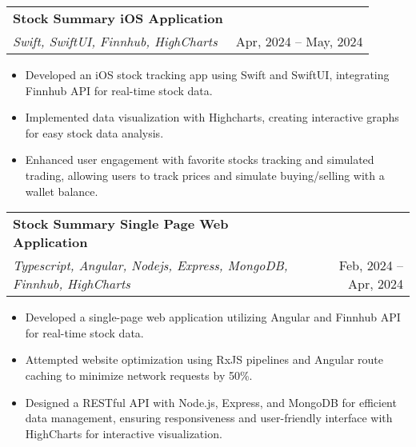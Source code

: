 \documentclass[letterpaper,11pt]{article}
\makeatletter
\newcommand{\resumeItem}[1]{
  \item\small{
    {#1 \vspace{-2pt}}
  }
}
\newcommand{\resumeProjectHeading}[1]{
    \item
    \begin{tabular*}{1.001\textwidth}{l@{\extracolsep{\fill}}r}
      \small#1\\
    \end{tabular*}\vspace{-7pt}
}
\newcommand{\resumeItemListStart}{\begin{itemize}}
\newcommand{\resumeItemListEnd}{\end{itemize}\vspace{-5pt}}
\makeatother
\begin{document}
\resumeProjectHeading
{\textbf{Stock Summary iOS Application \href{https://drive.google.com/file/d/13OWHwxpiQEl2slM0-ieL7HKOwFjjfK7o/view?usp=sharing}{\faLink}} \\
  \emph{Swift, SwiftUI, Finnhub, HighCharts} & {Apr, 2024 -- May, 2024}}
\vspace{-3pt}
\resumeItemListStart
\resumeItem{Developed an iOS stock tracking app using Swift and SwiftUI, integrating Finnhub API for real-time stock data.}
\resumeItem{Implemented data visualization with Highcharts, creating interactive graphs for easy stock data analysis.}
\resumeItem{Enhanced user engagement with favorite stocks tracking and simulated trading, allowing users to track prices and simulate buying/selling with a wallet balance.}
\resumeItemListEnd
\vspace{-6pt}

\resumeProjectHeading
{\textbf{Stock Summary Single Page Web Application \href{https://kishan-csci571-spring24-hw3.wl.r.appspot.com/}{\faLink}} \\
  \emph{Typescript, Angular, Nodejs, Express, MongoDB, Finnhub, HighCharts} & {Feb, 2024 -- Apr, 2024}}
\vspace{-3pt}
\resumeItemListStart
\resumeItem{Developed a single-page web application utilizing Angular and Finnhub API for real-time stock data.}
\resumeItem{Attempted website optimization using RxJS pipelines and Angular route caching to minimize network requests by 50\%.}
\resumeItem{Designed a RESTful API with Node.js, Express, and MongoDB for efficient data management, ensuring responsiveness and user-friendly interface with HighCharts for interactive visualization.}
\resumeItemListEnd
\vspace{-6pt}

\end{document}

